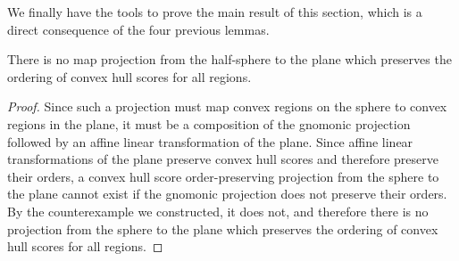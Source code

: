We finally have the tools to prove the main result of this section,
which is a direct consequence of the four previous lemmas.

\begin{theorem}
  There is no map projection from the half-sphere to the plane which
  preserves the ordering of convex hull scores for all regions.
\end{theorem}

\begin{proof}
  Since such a projection must map convex regions on the sphere to
  convex regions in the plane, it must be a composition of the gnomonic
  projection followed by an affine linear transformation of the plane.
  Since affine linear transformations of the plane preserve convex hull
  scores and therefore preserve their orders, a convex hull score
  order-preserving projection from the sphere to the plane cannot exist
  if the gnomonic projection does not preserve their orders.  By the
  counterexample we constructed, it does not, and therefore there is no
  projection from the sphere to the plane which preserves the ordering
  of convex hull scores for all regions.
\end{proof}
